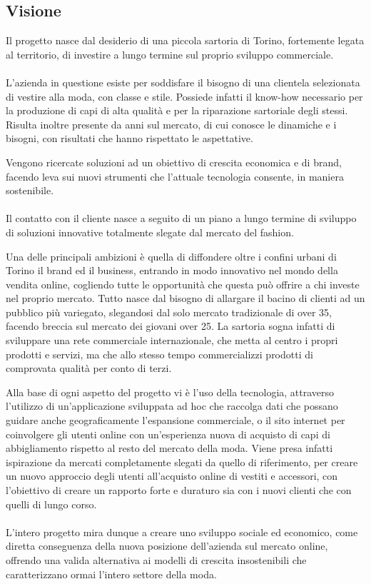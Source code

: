 \documentclass[12pt]{article}
\begin{document}
\subsection{Visione}

Il progetto nasce dal desiderio di una piccola sartoria di Torino, fortemente legata al territorio, di investire a lungo termine sul proprio sviluppo commerciale.
\\
\\
L'azienda in questione esiste per soddisfare il bisogno di una clientela selezionata di vestire alla moda, con classe e stile. Possiede infatti il know-how necessario per la produzione di capi di alta qualità e per la riparazione sartoriale degli stessi. Risulta inoltre presente da anni sul mercato, di cui conosce le dinamiche e i bisogni, con risultati che hanno rispettato le aspettative.


Vengono ricercate soluzioni ad un obiettivo di crescita economica e di brand, facendo leva sui nuovi strumenti che l'attuale tecnologia consente, in maniera sostenibile.
\\
\\
Il contatto con il cliente nasce a seguito di un piano a lungo termine di sviluppo di soluzioni innovative totalmente slegate dal mercato del fashion.

Una delle principali ambizioni è quella di diffondere oltre i confini urbani di Torino il brand ed il business, entrando in modo innovativo nel mondo della vendita online, cogliendo tutte le opportunità che questa può offrire a chi investe nel proprio mercato.
Tutto nasce dal bisogno di allargare il bacino di clienti ad un pubblico più variegato, slegandosi dal solo mercato tradizionale di over 35, facendo breccia sul mercato dei giovani over 25.
La sartoria sogna infatti di sviluppare una rete commerciale internazionale, che metta al centro i propri prodotti e servizi, ma che allo stesso tempo commercializzi prodotti di comprovata qualità per conto di terzi.

Alla base di ogni aspetto del progetto vi è l'uso della tecnologia, attraverso l'utilizzo di un'applicazione sviluppata ad hoc che raccolga dati che possano guidare anche geograficamente l'espansione commerciale, o il sito internet per coinvolgere gli utenti online con un'esperienza nuova di acquisto di capi di abbigliamento rispetto al resto del mercato della moda.
Viene presa infatti ispirazione da mercati completamente slegati da quello di riferimento, per creare un nuovo approccio degli utenti all'acquisto online di vestiti e accessori, con l'obiettivo di creare un rapporto forte e duraturo sia con i nuovi clienti che con quelli di lungo corso.
\\
\\
L'intero progetto mira dunque a creare uno sviluppo sociale ed economico, come diretta conseguenza della nuova posizione dell'azienda sul mercato online, offrendo una valida alternativa ai modelli di crescita insostenibili che caratterizzano ormai l'intero settore della moda.
\end{document}
